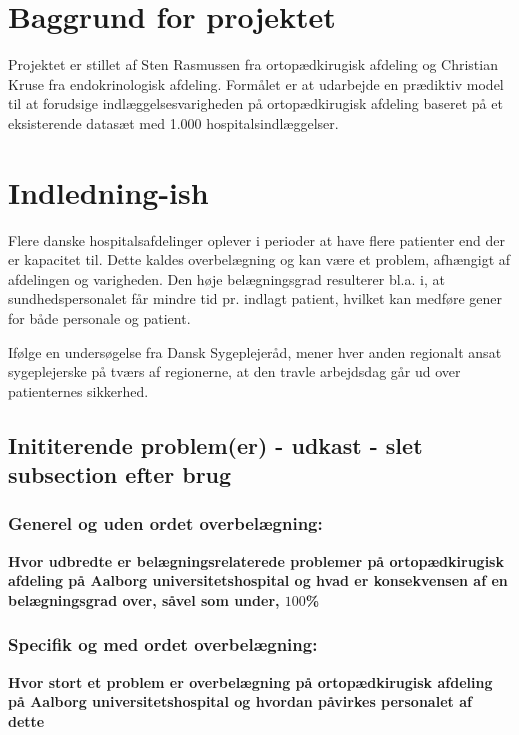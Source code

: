 \section{Baggrund for projektet}
Projektet er stillet af Sten Rasmussen fra ortopædkirugisk afdeling og Christian Kruse fra endokrinologisk afdeling. Formålet er at udarbejde en prædiktiv model til at forudsige indlæggelsesvarigheden på ortopædkirugisk afdeling baseret på et eksisterende datasæt med 1.000 hospitalsindlæggelser. 

\section{Indledning-ish}
Flere danske hospitalsafdelinger oplever i perioder at have flere patienter end der er kapacitet til. Dette kaldes overbelægning og kan være et problem, afhængigt af afdelingen og varigheden.\cite{SDS2015} Den høje belægningsgrad resulterer bl.a. i, at sundhedspersonalet får mindre tid pr. indlagt patient, hvilket kan medføre gener for både personale og patient.\cite{Kjeldsen2015}

Ifølge en undersøgelse fra Dansk Sygeplejeråd, mener hver anden regionalt ansat sygeplejerske på tværs af regionerne, at den travle arbejdsdag går ud over patienternes sikkerhed\cite{Kjeldsen2015}.

\subsection{Inititerende problem(er) - udkast - slet subsection efter brug}
\subsubsection{Generel og uden ordet overbelægning:}
\textbf{Hvor udbredte er belægningsrelaterede problemer på ortopædkirugisk afdeling på Aalborg universitetshospital og hvad er konsekvensen af en belægningsgrad over, såvel som under, $100$\%}

\subsubsection{Specifik og med ordet overbelægning:}
\textbf{Hvor stort et problem er overbelægning på ortopædkirugisk afdeling på Aalborg universitetshospital og hvordan påvirkes personalet af dette}